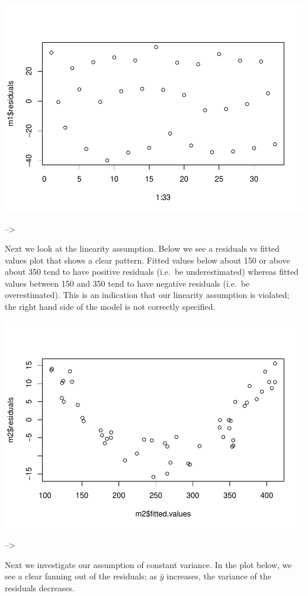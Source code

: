 \documentclass[]{book}
\begin{document}
\includegraphics{MA206supplement_files/figure-latex/unnamed-chunk-10-1.pdf}

--\textgreater{}

Next we look at the linearity assumption. Below we see a residuals vs fitted values plot that shows a clear pattern. Fitted values below about 150 or above about 350 tend to have positive residuals (i.e.~be underestimated) whereas fitted values between 150 and 350 tend to have negative residuals (i.e.~be overestimated). This is an indication that our linearity assumption is violated; the right hand side of the model is not correctly specified.

\includegraphics{MA206supplement_files/figure-latex/unnamed-chunk-12-1.pdf}

--\textgreater{}

Next we investigate our assumption of constant variance. In the plot below, we see a clear fanning out of the residuals; as \(\hat{y}\) increases, the variance of the residuals decreases.
\end{document}
